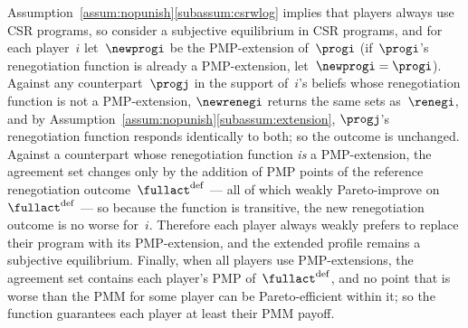 
\begin{sketch}
Assumption~\ref{assum:nopunish}\ref{subassum:csrwlog}
implies that players always use CSR programs, so consider a subjective
equilibrium in CSR programs, and for each player~$i$ let~$\newprogi$ be
the PMP-extension of~$\progi$ (if~$\progi$'s renegotiation function is
already a PMP-extension, let~$\newprogi = \progi$).
Against any counterpart~$\progj$ in the support of~$i$'s beliefs whose
renegotiation function is not a PMP-extension, $\newrenegi$ returns the
same sets as~$\renegi$, and by
Assumption~\ref{assum:nopunish}\ref{subassum:extension}, $\progj$'s
renegotiation function responds identically to both; so the outcome is
unchanged.
Against a counterpart whose renegotiation function \textit{is} a
PMP-extension, the agreement set changes only by the addition of PMP
points of the reference renegotiation
outcome~$\fullact^{\mathrm{def}}$
--- all of which weakly Pareto-improve
on~$\fullact^{\mathrm{def}}$ --- so
because the \selfunction{} function is transitive, the new renegotiation
outcome is no worse for~$i$.
Therefore each player always weakly prefers to replace their program with
its PMP-extension, and the extended profile remains a subjective
equilibrium.
Finally, when all players use PMP-extensions, the agreement set contains
each player's PMP of~$\fullact^{\mathrm{def}}$, and no point that is worse
than the PMM for some player can be Pareto-efficient within it; so the
\selfunction{} function guarantees each player at least their PMM payoff.
\end{sketch}

